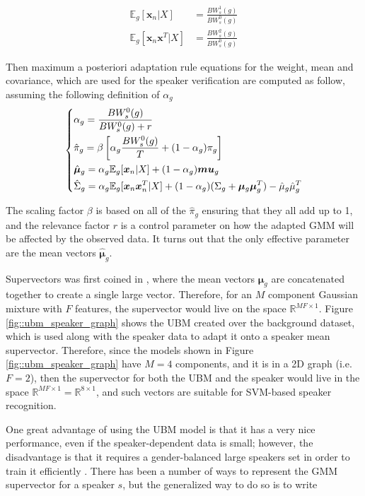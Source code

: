 \begin{align*}
    \mathbb{E}_g [\bm{x}_n | X] &= \frac{BW^1_s (g)}{BW^0_s (g)} \\
    \mathbb{E}_g [\bm{x}_n \bm{x}^T | X] &= \frac{BW^2_s (g)}{BW^0_s (g)}
\end{align*}

Then maximum a posteriori adaptation rule equations for the weight, mean and covariance, which are used for the speaker verification are computed as follow, assuming the following definition of $\alpha_g$
\begin{equation*}
\begin{dcases}
    \alpha_g = \frac{BW^0_s(g)}{BW^0_s(g) + r} \\
    \hat{\pi}_g = \beta \left[\alpha_g \frac{BW^0_s(g)}{T} + (1-\alpha_g) \pi_g\right]  \\
    \hat{\bm{\mu}}_g = \alpha_g \mathbb{E}_g [\bm{x}_n | X] + (1-\alpha_g) \bm{mu}_g \\
    \hat{\Sigma}_g = \alpha_g \mathbb{E}_g [\bm{x}_n \bm{x}_n^T | X ] + (1-\alpha_g)(\Sigma_g + \bm{\mu}_g  \bm{\mu}_g^T) - \hat{\mu}_g \hat{\mu}_g^T
\end{dcases}
\end{equation*}

The scaling factor $\beta$ is based on all of the $\hat{\pi}_g$ ensuring that they all add up to 1, and the relevance factor $r$ is a control parameter on how the adapted GMM will be affected by the observed data. It turns out that the only effective parameter are the mean vectors $\hat{\bm{\mu}}_g$.

Supervectors was first coined in \cite{supervectors}, where the mean vectors $\bm{\mu}_g$ are concatenated together to create a single large vector. Therefore, for an $M$ component Gaussian mixture with $F$ features, the supervector would live on the space $\mathbb{R}^{MF\times 1}$. Figure \ref{fig::ubm_speaker_graph} shows the UBM created over the background dataset, which is used along with the speaker data to adapt it onto a speaker mean supervector. Therefore, since the models shown in Figure \ref{fig::ubm_speaker_graph} have $M=4$ components, and it is in a 2D graph (i.e. $F=2$), then the supervector for both the UBM and the speaker would live in the space $\mathbb{R}^{MF\times 1} = \mathbb{R}^{8\times 1}$, and such vectors are suitable for SVM-based speaker recognition.

One great advantage of using the UBM model is that it has a very nice performance, even if the speaker-dependent data is small; however, the disadvantage is that it requires a gender-balanced large speakers set in order to train it efficiently \cite{advantageUBM}. There has been a number of ways to represent the GMM supervector for a speaker $s$, but the generalized way to do so is to write

